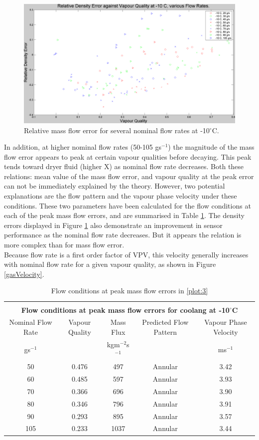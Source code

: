 \documentclass{report}
\begin{document}
\begin{figure}
\includegraphics[width=\textwidth]{plots/fig4}
\caption{Relative mass flow error for several nominal flow rates at -10$^\circ$C.}
\label{plot:4}
\end{figure}
\FloatBarrier
In addition, at higher nominal flow rates (50-105 gs$^{-1}$) the magnitude of the mass flow error appears to peak at certain vapour qualities before decaying. This peak tends toward dryer fluid (higher X) as nominal flow rate decreases. Both these relations: mean value of the mass flow error, and vapour quality at the peak error can not be immediately explained by the theory. However, two potential explanations are the flow pattern and the vapour phase velocity under these conditions. These two parameters have been calculated for the flow conditions at each of the peak mass flow errors, and are summarised in Table \ref{tab:flowConditions}. The density errors displayed in Figure \ref{plot:4} also demonstrate an improvement in sensor performance as the nominal flow rate decreases. But it appears the relation is more complex than for mass flow error. \\
Because flow rate is a first order factor of VPV, this velocity generally increases with nominal flow rate for a given vapour quality, as shown in Figure \ref{gasVelocity}.
\FloatBarrier
\begin{table}
\begin{tabular}{|c|c|c|c|c|}
\hline\\
\multicolumn{5}{|c|}{\textbf{Flow conditions at peak mass flow errors for coolang at -10$^\circ$C}}\\\hline
Nominal Flow Rate & Vapour Quality & Mass Flux & Predicted Flow Pattern & Vapour Phase Velocity \\\hline
gs$^{-1}$ &  & kgm$^{-2}$s$^{-1}$ & & ms$^{-1}$\\\hline
50 &0.476 & 497 & Annular & 3.42 \\\hline
60 &0.485 & 597 & Annular & 3.93 \\\hline
70 &0.366 & 696 & Annular & 3.90 \\\hline
80 &0.346 & 796 & Annular & 3.91 \\\hline
90 &0.293 & 895 & Annular & 3.57 \\\hline
105 & 0.233 & 1037 & Annular & 3.44 \\\hline
\end{tabular}
\caption{Flow conditions at peak mass flow errors in \ref{plot:3}}
\label{tab:flowConditions}
\end{table}
\end{document}
